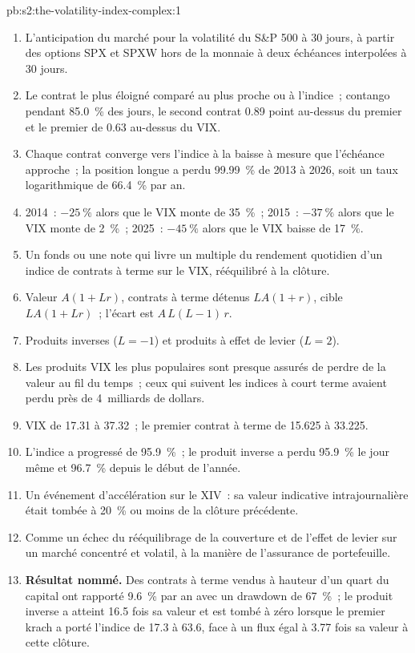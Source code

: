\begin{solution}{pb:s2:the-volatility-index-complex:1}
\begin{enumerate}
\item L'anticipation du marché pour la volatilité du S\&P 500 à 30 jours, à partir des options SPX et SPXW hors de la monnaie à deux échéances interpolées à 30 jours.
\item Le contrat le plus éloigné comparé au plus proche ou à l'indice~; contango pendant 85.0~\% des jours, le second contrat 0.89 point au-dessus du premier et le premier
de 0.63 au-dessus du VIX.
\item Chaque contrat converge vers l'indice à la baisse à mesure que l'échéance approche~; la position longue a perdu 99.99~\% de 2013 à 2026, soit un taux logarithmique de 66.4~\% par an.
\item 2014~: $-25~\%$ alors que le VIX monte de 35~\%~; 2015~: $-37~\%$ alors que le VIX monte de 2~\%~; 2025~: $-45~\%$ alors que le VIX baisse de 17~\%.
\item Un fonds ou une note qui livre un multiple du rendement quotidien d'un indice de contrats à terme sur le VIX, rééquilibré à la clôture.
\item Valeur $A(1 + Lr)$, contrats à terme détenus $LA(1 + r)$, cible $LA(1 + Lr)$~; l'écart est $A\,L(L - 1)\,r$.
\item Produits inverses ($L = -1$) et produits à effet de levier ($L = 2$).
\item Les produits VIX les plus populaires sont presque assurés de perdre de la valeur au fil du temps~; ceux qui suivent les indices à court terme avaient perdu près de 4~milliards de dollars.
\item VIX de 17.31 à 37.32~; le premier contrat à terme de 15.625 à 33.225.
\item L'indice a progressé de 95.9~\%~; le produit inverse a perdu 95.9~\% le jour même et 96.7~\% depuis le début de l'année.
\item Un événement d'accélération sur le XIV~: sa valeur indicative intrajournalière était tombée à 20~\% ou moins de la clôture précédente.
\item Comme un échec du rééquilibrage de la couverture et de l'effet de levier sur un marché concentré et volatil, à la manière de l'assurance de portefeuille.
\item \textbf{Résultat nommé.} Des contrats à terme vendus à hauteur d'un quart du capital ont rapporté 9.6~\% par an avec un drawdown de 67~\%~; le produit inverse a atteint 16.5 fois
sa valeur et est tombé à zéro lorsque le premier krach a porté l'indice de 17.3 à 63.6, face à un flux égal à 3.77 fois sa valeur à cette clôture.

\end{enumerate}
\end{solution}
